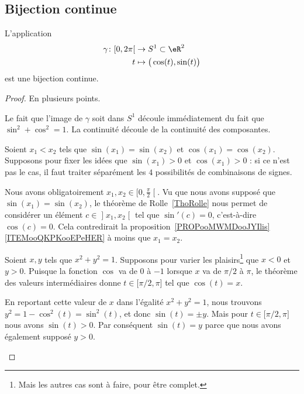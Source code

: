\subsection{Bijection continue}

\begin{proposition}     \label{PROPooKSGXooOqGyZj}
	L'application
	\begin{equation}
		\begin{aligned}
			\gamma\colon \mathopen[ 0 , 2\pi \mathclose[ & \to S^1\subset \eR^2                \\
			t                                            & \mapsto \big( \cos(t),\sin(t) \big)
		\end{aligned}
	\end{equation}
	est une bijection continue.
\end{proposition}

\begin{proof}
	En plusieurs points.
	\begin{subproof}
		\spitem[Image]
		Le fait que l'image de \( \gamma\) soit dans \( S^1\) découle immédiatement du fait que \( \sin^2+\cos^2=1\).
		\spitem[Continuité]
		La continuité découle de la continuité des composantes.

		\spitem[Injectif]
		Soient \( x_1<x_2\) tels que \( \sin(x_1)=\sin(x_2)\) et \( \cos(x_1)=\cos(x_2)\). Supposons pour fixer les idées que \( \sin(x_1)>0\) et \( \cos(x_1)>0\) : si ce n'est pas le cas, il faut traiter séparément les \( 4\) possibilités de combinaisons de signes.

		Nous avons obligatoirement \( x_1,x_2\in\mathopen[ 0 , \frac{ \pi }{ 2 } \mathclose[\). Vu que nous avons supposé que \( \sin(x_1)=\sin(x_2)\), le théorème de Rolle~\ref{ThoRolle} nous permet de considérer un élément \( c\in \mathopen] x_1 , x_2 \mathclose[\) tel que \( \sin'(c)=0\), c'est-à-dire \( \cos(c)=0\). Cela contredirait la proposition~\ref{PROPooMWMDooJYIlis}\ref{ITEMooQKPKooEPeHER} à moins que \( x_1=x_2\).

		\spitem[Surjectif]

		Soient \( x,y\) tels que \( x^2+y^2=1\). Supposons pour varier les plaisirs\footnote{Mais les autres cas sont à faire, pour être complet.} que \( x<0\) et \( y>0\). Puisque la fonction \( \cos\) va de \( 0\) à \( -1\) lorsque \( x\) va de \( \pi/2\) à \( \pi\), le théorème des valeurs intermédiaires donne \( t\in\mathopen[ \pi/2 , \pi \mathclose]\) tel que \( \cos(t)=x\).

		En reportant cette valeur de \( x\) dans l'égalité \( x^2+y^2=1\), nous trouvons \( y^2=1-\cos^2(t)=\sin^2(t)\), et donc \( \sin(t)=\pm y\). Mais pour \( t\in \mathopen[ \pi/2 , \pi \mathclose]\) nous avons \( \sin(t)>0\). Par conséquent \( \sin(t)=y\) parce que nous avons également supposé \( y>0\).
	\end{subproof}
\end{proof}

